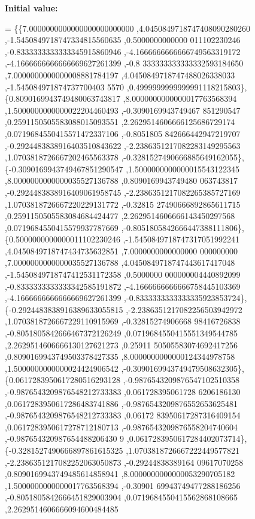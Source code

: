 {\bfseries Initial value\+:}
\begin{DoxyCode}
= \{\{7.0000000000000000000000000 ,4.0450849718747408090280260 ,-1.5450849718747334815560635 ,0.5000000000000
      011102230246 ,-0.8333333333333345915860946 ,-4.1666666666666749563319172 ,-4.1666666666666669627261399 ,-0.8
      333333333333332593184650 ,7.0000000000000008881784197 ,4.0450849718747488026338033 ,-1.545084971874737700403
      5570 ,0.4999999999999991118215803\},
\{0.8090169943749480063743817 ,8.0000000000000017763568394 ,1.5000000000000022204460493 ,-0.3090169943749467
      851290547 ,0.2591150505583088015093551 ,2.2629514606666125686729174 ,0.0719684550415571472337106 ,-0.8051805
      842666442947219707 ,-0.2924483838916403510843622 ,-2.2386351217082283149295563 ,1.0703818726667202465563378 
      ,-0.3281527490666885649162055\},
\{-0.3090169943749467851290547 ,1.5000000000000015543122345 ,8.0000000000000035527136788 ,0.8090169943749480
      063743817 ,-0.2924483838916409061958745 ,-2.2386351217082265385727169 ,1.0703818726667220229131772 ,-0.32815
      27490666892865611715 ,0.2591150505583084684424477 ,2.2629514606666143450297568 ,0.0719684550415579937787669 
      ,-0.8051805842666447388111806\},
\{0.5000000000000011102230246 ,-1.5450849718747317051992241 ,4.0450849718747434735632851 ,7.0000000000000000
      000000000 ,7.0000000000000035527136788 ,4.0450849718747443617417048 ,-1.5450849718747412531172358 ,0.5000000
      000000004440892099 ,-0.8333333333333342585191872 ,-4.1666666666666758445103369 ,-4.1666666666666669627261399
       ,-0.8333333333333335923853724\},
\{-0.2924483838916389633055815 ,-2.2386351217082256503942972 ,1.0703818726667229110915969 ,-0.32815274906668
      98416726838 ,-0.8051805842666467372126249 ,0.0719684550415551349544785 ,2.2629514606666130127621273 ,0.25911
      50505583074692417256 ,0.8090169943749503378427335 ,8.0000000000000124344978758 ,1.5000000000000024424906542 
      ,-0.3090169943749479508632305\},
\{0.0617283950617280516293128 ,-0.9876543209876547102510358 ,-0.9876543209876548212733383 ,0.061728395061728
      6206186130 ,0.0617283950617286483741886 ,-0.9876543209876552653625481 ,-0.9876543209876548212733383 ,0.06172
      83950617287316409154 ,0.0617283950617278712180713 ,-0.9876543209876558204740604 ,-0.987654320987654488206430
      9 ,0.0617283950617284402073714\},
\{-0.3281527490666897861615325 ,1.0703818726667222449577821 ,-2.2386351217082252063050873 ,-0.29244838389164
      09617070258 ,0.8090169943749485614858941 ,8.0000000000000053290705182 ,1.5000000000000017763568394 ,-0.30901
      69943749477288186256 ,-0.8051805842666451829003904 ,0.0719684550415562868108665 ,2.2629514606666094600484485

\end{DoxyCode}
